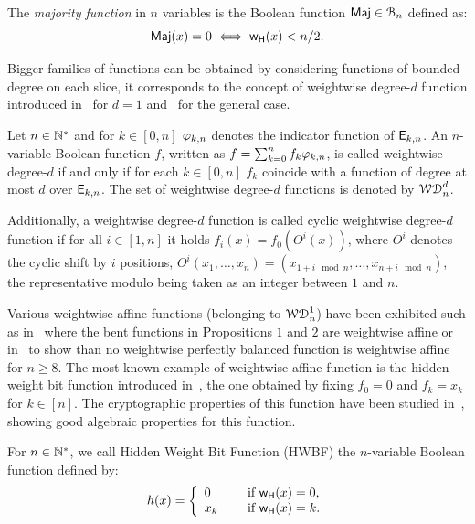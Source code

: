 \documentclass[11pt]{llncs}
\begin{document}
\begin{definition}\label{def:maj}
    The \emph{majority function} in $n$ variables is the Boolean function $\textsf{Maj}\in\mathcal{B}_n$ defined as:
    \[
        \textsf{Maj}(x)=0\iff\mathsf{w_H}(x)<n/2.
    \]
\end{definition}

Bigger families of functions can be obtained by considering functions of bounded degree on each slice, it corresponds to the concept of weightwise degree-$d$ function introduced in~\cite{DAM:GinMea22} for $d=1$ and~\cite{DAM:MeaOza24} for the general case. 

\begin{definition}\label{def:wwdegd}
	Let $n\in \mathbb{N}^*$ and for $k\in[0,n]$ $\varphi_{k,n}$ denotes the indicator function of $\mathsf{E}_{k,n}$. 
	An $n$-variable Boolean function $f$, written as $f=\sum_{k=0}^n f_k \varphi_{k,n}$, is called weightwise degree-$d$ if and only if for each $k\in [0,n]$ $f_k$ coincide with a function of degree at most $d$ over $\mathsf{E}_{k,n}$. 
		The set of weightwise degree-$d$ functions is denoted by $\mathcal{WD}^{d}_{n}$.
		
Additionally, a weightwise degree-$d$ function is called cyclic weightwise degree-$d$ function if for all $i\in [1,n]$ it holds $f_i(x)=f_0(O^i(x))$, where $O^i$ denotes the cyclic shift by $i$ positions, $O^i(x_1,\dots,x_n)=(x_{1+i \mod n},\dots,x_{n+i \mod n})$, the representative modulo being taken as an integer between $1$ and $n$.
\end{definition}



Various weightwise affine functions (\ie belonging to $\mathcal{WD}^{1}_{n}$) have been exhibited such as in~\cite{TOSC:CarMeaRot17} where the bent functions in Propositions $1$ and $2$ are weightwise affine or in~\cite{DAM:GinMea22} to show than no weightwise perfectly balanced function is weightwise affine for $n\ge 8$. 
The most known example of weightwise affine function is the hidden weight bit function introduced in~\cite{IEEE:Bryant91}, the one obtained by fixing $f_0=0$ and $f_k=x_k$ for $k \in [n]$. The cryptographic properties of this function have been studied in~\cite{DAM:WCST14}, showing good algebraic properties for this function.

\begin{definition}\label{def:hwbf}
	For $n\in \mathbb{N}^*$, we call Hidden Weight Bit Function (HWBF) the $n$-variable Boolean function defined by:
	\[h(x)= \left\{ 
	\begin{array}{l l}
	0 & \quad \text{ if } \mathsf{w_H}(x) =0, \\
	x_k & \quad \text{ if } \mathsf{w_H}(x)=k.
	\end{array} \right. \] 

\end{definition}
\end{document}
